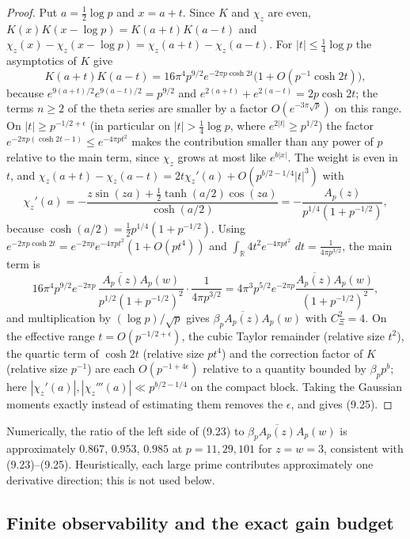 \documentclass[11pt]{amsart}
\theoremstyle{definition}
\theoremstyle{remark}
\newcommand{\dd}{\,d}
\begin{document}
\begin{proof}
Put \(a=\frac12\log p\) and \(x=a+t\).  Since \(K\) and \(\chi_z\) are
even, \(K(x)K(x-\log p)=K(a+t)K(a-t)\) and
\(\chi_z(x)-\chi_z(x-\log p)=\chi_z(a+t)-\chi_z(a-t)\).  For
\(\lvert t\rvert\le\frac14\log p\) the asymptotics of \(K\) give
\[
 K(a+t)K(a-t)=16\pi^4p^{9/2}e^{-2\pi p\cosh 2t}
 \bigl(1+O(p^{-1}\cosh 2t)\bigr),
\]
because \(e^{9(a+t)/2}e^{9(a-t)/2}=p^{9/2}\) and
\(e^{2(a+t)}+e^{2(a-t)}=2p\cosh2t\); the terms \(n\ge2\) of the theta
series are smaller by a factor \(O(e^{-3\pi\sqrt p})\) on this range.  On
\(\lvert t\rvert\ge p^{-1/2+\epsilon}\) (in particular on
\(\lvert t\rvert>\frac14\log p\), where \(e^{2|t|}\ge p^{1/2}\)) the
factor \(e^{-2\pi p(\cosh2t-1)}\le e^{-4\pi pt^2}\) makes the
contribution smaller than any power of \(p\) relative to the main term,
since \(\chi_z\) grows at most like \(e^{b|x|}\).  The weight is even
in \(t\), and
\(\chi_z(a+t)-\chi_z(a-t)=2t\chi_z'(a)+O(p^{b/2-1/4}\lvert t\rvert^3)\)
with
\[
 \chi_z'(a)=-\frac{z\sin(za)+\frac12\tanh(a/2)\cos(za)}{\cosh(a/2)}
 =-\frac{A_p(z)}{p^{1/4}(1+p^{-1/2})},
\]
because \(\cosh(a/2)=\frac12p^{1/4}(1+p^{-1/2})\).  Using
\(e^{-2\pi p\cosh2t}=e^{-2\pi p}e^{-4\pi pt^2}(1+O(pt^4))\) and
\(\int_{\mathbb R}4t^2e^{-4\pi pt^2}\,\dd t=\frac1{4\pi p^{3/2}}\), the
main term is
\[
 16\pi^4p^{9/2}e^{-2\pi p}\,\frac{\overline{A_p(z)}A_p(w)}
 {p^{1/2}(1+p^{-1/2})^2}\cdot\frac1{4\pi p^{3/2}}
 =4\pi^3p^{5/2}e^{-2\pi p}\frac{\overline{A_p(z)}A_p(w)}{(1+p^{-1/2})^2},
\]
and multiplication by \((\log p)/\sqrt p\) gives
\(\beta_p\overline{A_p(z)}A_p(w)\) with \(C_\Xi^2=4\).  On the
effective range \(t=O(p^{-1/2+\epsilon})\), the cubic Taylor remainder
(relative size \(t^2\)), the quartic term of \(\cosh2t\) (relative size
\(pt^4\)) and the correction factor of \(K\) (relative size \(p^{-1}\))
are each \(O(p^{-1+4\epsilon})\) relative to a quantity bounded by
\(\beta_pp^{b}\); here \(|\chi_z'(a)|,|\chi_z'''(a)|\ll p^{b/2-1/4}\) on
the compact block.  Taking the Gaussian moments exactly instead of
estimating them removes the \(\epsilon\), and gives (9.25).
\end{proof}

Numerically, the ratio of the left side of (9.23) to
\(\beta_p\overline{A_p(z)}A_p(w)\) is approximately \(0.867\),
\(0.953\), \(0.985\) at \(p=11,29,101\) for \(z=w=3\), consistent with
(9.23)--(9.25).
Heuristically, each large prime contributes approximately one derivative
direction; this is not used below.

\subsection{Finite observability and the exact gain budget}
\end{document}
